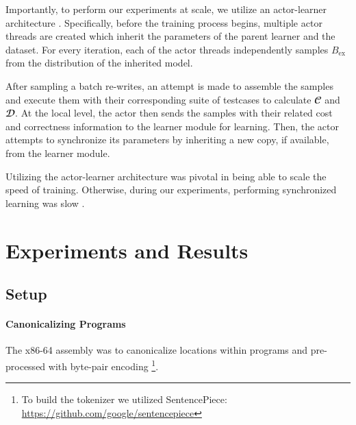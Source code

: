 \documentclass{article}
\begin{document}
Importantly, to perform our experiments at scale, we utilize an actor-learner architecture  \citep{liang2018memory, espeholt2018impala}. Specifically, before the training process begins, multiple actor threads are created which inherit the parameters of the parent learner and the dataset. For every iteration, each of the actor threads independently samples $B_{\textrm{ex}}$ from the distribution of the inherited model. 

After sampling a batch re-writes, an attempt is made to assemble the samples and execute them with their corresponding suite of testcases to calculate $\mathbfcal{C}$ and $\mathbfcal{D}$. At the local level, the actor then sends the samples with their related cost and correctness information to the learner module for learning. Then, the actor attempts to synchronize its parameters by inheriting a new copy, if available, from the learner module.

Utilizing the actor-learner architecture was pivotal in being able to scale the speed of training. Otherwise, during our experiments, performing synchronized learning was slow . 


\section{Experiments and Results}

\subsection{Setup}

\paragraph{Canonicalizing Programs} The x86-64 assembly was to canonicalize locations within programs and pre-processed  with byte-pair encoding \citep{sennrich2015neural} \footnote{To build the tokenizer we utilized SentencePiece: \url{https://github.com/google/sentencepiece}}.  

\end{document}
